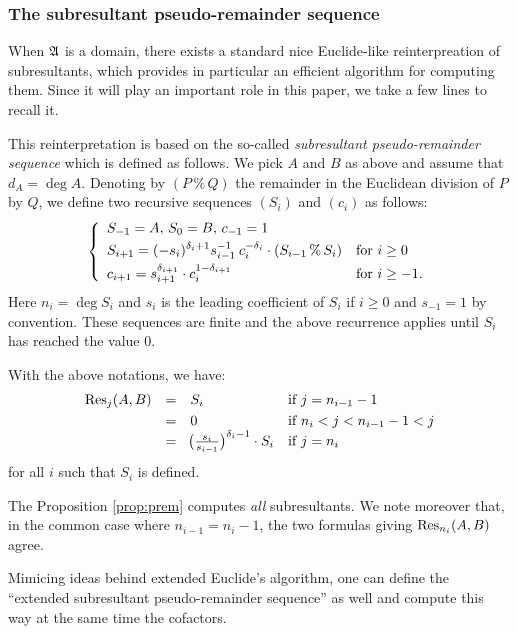 \documentclass{article}
\begin{document}
\subsubsection*{The subresultant pseudo-remainder sequence}


When $\mathfrak A$ is a domain, there exists a standard nice Euclide-like
reinterpreation of subresultants, which provides in particular an 
efficient algorithm for computing them. Since it will play an important 
role in this paper, we take a few lines to recall it.

This reinterpretation is based on the so-called \emph{subresultant 
pseudo-remainder sequence} which is defined as follows. We pick $A$ and 
$B$ as above and assume that $d_A = \deg A$. Denoting by $(P \,\%\, Q)$ 
the remainder in the Euclidean division of $P$ by $Q$, we define two 
recursive sequences $(S_i)$ and $(c_i)$ as follows:
$$\left\{\begin{array}{ll}
S_{-1} = A, \, S_0 = B, \, c_{-1} = 1 \smallskip \\
\displaystyle S_{i+1} = (-s_i)^{\delta_i + 1}
s_{i-1}^{-1} \: c_i^{-\delta_i} \cdot (S_{i-1} \,\%\, S_i)
& \text{for } i \geq 0 \smallskip \\
\displaystyle c_{i+1} = s_{i+1}^{\delta_{i+1}} \cdot c_i^{1-\delta_{i+1}}
& \text{for } i \geq -1. 
\end{array}\right.$$
Here $n_i = \deg S_i$  
and $s_i$ is the leading coefficient of 
$S_i$ if $i \geq 0$ and $s_{-1} = 1$ by convention. These sequences 
are finite and the above recurrence applies until $S_i$ has reached 
the value $0$.

\begin{prop}
\label{prop:prem}
With the above notations, we have:
$$\begin{array}{rcll}
\Res_j(A,B) & = & S_i & \text{if } j = n_{i-1} - 1 \smallskip \\
& = & 0 & \text{if } n_i < j < n_{i-1} - 1 < j \\
& = & \!\big(\frac{s_i}{s_{i-1}}\big)^{\delta_i-1} \cdot S_i & 
\text{if } j = n_i
\end{array}$$
for all $i$ such that $S_i$ is defined.
\end{prop}

\begin{rem}
The Proposition \ref{prop:prem} computes \emph{all} subresultants. We
note moreover that, in the common case where $n_{i-1} = n_i - 1$, the
two formulas giving $\text{\rm Res}_{n_i}(A,B)$ agree.

Mimicing ideas behind extended Euclide's algorithm, one can define the 
``extended subresultant pseudo-remainder sequence'' as well and compute
this way at the same time the cofactors.
\end{rem}
\end{document}
